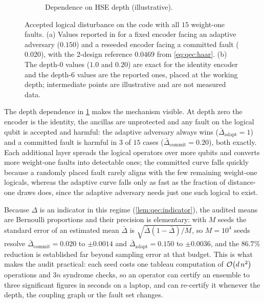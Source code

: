 \begin{figure}[htbp]
\begin{subfigure}[t]{0.48\textwidth}
\caption{Dependence on HSE depth (illustrative).}
\label{fig:qec:disturbance-depth}
\end{subfigure}
\caption{Accepted logical disturbance on the  code with all $15$ weight-one faults. (a) Values reported in \cite{guo2026qecaudit} for a fixed encoder facing an adaptive adversary ($0.150$) and a reseeded encoder facing a committed fault ($0.020$), with the 2-design reference $0.0469$ from \cref{eq:qec:haar}. (b) The depth-$0$ values ($1.0$ and $0.20$) are exact for the identity encoder and the depth-$6$ values are the reported ones, placed at the working depth; intermediate points are illustrative and are not measured data.}
\label{fig:qec:disturbance}
\end{figure}

The depth dependence in \cref{fig:qec:disturbance-depth} makes the mechanism visible. At depth zero the encoder is the identity, the ancillas are unprotected and any fault on the logical qubit is accepted and harmful: the adaptive adversary always wins ($\bar\Delta_{\mathrm{adapt}}=1$) and a committed fault is harmful in $3$ of $15$ cases ($\bar\Delta_{\mathrm{commit}}=0.20$), both exactly. Each additional layer spreads the logical operators over more qubits and converts more weight-one faults into detectable ones; the committed curve falls quickly because a randomly placed fault rarely aligns with the few remaining weight-one logicals, whereas the adaptive curve falls only as fast as the fraction of distance-one draws does, since the adaptive adversary needs just one such logical to exist.

Because $\Delta$ is an indicator in this regime (\cref{lem:qec:indicator}), the audited means are Bernoulli proportions and their precision is elementary: with $M$ seeds the standard error of an estimated mean $\bar\Delta$ is $\sqrt{\bar\Delta(1-\bar\Delta)/M}$, so $M=10^{4}$ seeds resolve $\bar\Delta_{\mathrm{commit}}=0.020$ to $\pm 0.0014$ and $\bar\Delta_{\mathrm{adapt}}=0.150$ to $\pm 0.0036$, and the $86.7\%$ reduction is established far beyond sampling error at that budget. This is what makes the audit practical: each seed costs one tableau computation of $\mathcal{O}\!\left(d\,n^{2}\right)$ operations and $3n$ syndrome checks, so an operator can certify an ensemble to three significant figures in seconds on a laptop, and can re-certify it whenever the depth, the coupling graph or the fault set changes.

